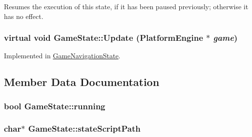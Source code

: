 Resumes the execution of this state, if it has been paused previously; otherwise it has no effect. \hypertarget{class_game_state_100ca49bc95afce1d5c5b756708bbc2b}{
\subsubsection[{Update}]{\setlength{\rightskip}{0pt plus 5cm}virtual void GameState::Update ({\bf PlatformEngine} $\ast$ {\em game})}}
\label{dd/d87/class_game_state_100ca49bc95afce1d5c5b756708bbc2b}




Implemented in \hyperlink{class_game_navigation_state_90f5e6d6287a875d8f2737180f46a004}{GameNavigationState}.

\subsection{Member Data Documentation}
\hypertarget{class_game_state_391df04a740c7480270d3c71a578b43a}{
\subsubsection[{running}]{\setlength{\rightskip}{0pt plus 5cm}bool {\bf GameState::running}}}
\label{dd/d87/class_game_state_391df04a740c7480270d3c71a578b43a}


\hypertarget{class_game_state_bfe09abe78dd5794426964d3392b2973}{
\subsubsection[{stateScriptPath}]{\setlength{\rightskip}{0pt plus 5cm}char$\ast$ {\bf GameState::stateScriptPath}}}
\label{dd/d87/class_game_state_bfe09abe78dd5794426964d3392b2973}



